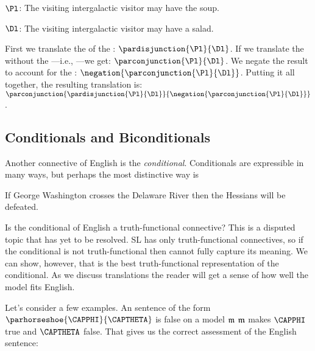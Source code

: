 \begin{description}[itemsep=0em]
	\item[Translation Key:] \hfill{} 
	\begin{description}[itemsep=0em]
		\item $\Pl$: The visiting intergalactic visitor may have the soup.
		\item $\Dl$: The visiting intergalactic visitor may have a salad.
	\end{description} 
\end{description}

\noindent{}First we translate the  of the : $\pardisjunction{\Pl}{\Dl}$.
If we translate the  without the ---i.e., ---we get: $\parconjunction{\Pl}{\Dl}$.
We negate the result to account for the : $\negation{\parconjunction{\Pl}{\Dl}}$.
Putting it all together, the resulting translation is: $\parconjunction{\pardisjunction{\Pl}{\Dl}}{\negation{\parconjunction{\Pl}{\Dl}}}$.

\subsection{Conditionals and Biconditionals}\label{Translating GSLConditionals}

Another connective of English is the \emph{conditional}.
Conditionals are expressible in many ways, but perhaps the most distinctive way is 

\begin{menumerate}
	\item If George Washington crosses the Delaware River then the Hessians will be defeated.
\end{menumerate}

\noindent{}Is the conditional of English a truth-functional connective?
This is a disputed topic that has yet to be resolved.
SL has only truth-functional connectives, so if the conditional is not truth-functional then \mention{$\HORSESHOE$} cannot fully capture its meaning.
We can show, however, that \mention{$\HORSESHOE$} is the best truth-functional representation of the conditional.
As we discuss translations the reader will get a sense of how well the model fits English.

Let's consider a few examples.
An \GSL{} sentence of the form $\parhorseshoe{\CAPPHI}{\CAPTHETA}$ is false on a model $\mathfrak{m}$ \Iff $\mathfrak{m}$ makes $\CAPPHI$ true and $\CAPTHETA$ false.
That gives us the correct assessment of the English sentence:

